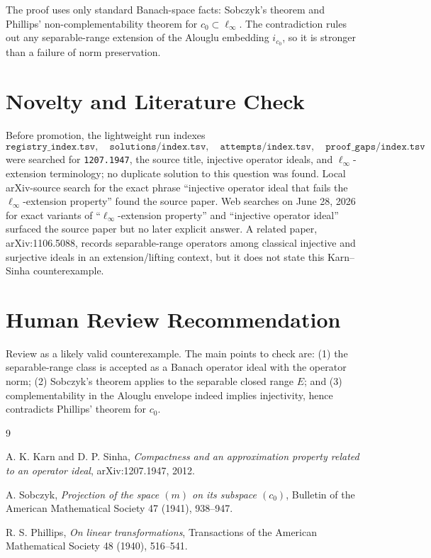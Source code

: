 \documentclass[11pt]{article}
\newcommand{\linf}{\ell_\infty}
\newcommand{\czero}{c_0}
\begin{document}
The proof uses only standard Banach-space facts: Sobczyk's theorem and Phillips' non-complementability theorem for $\czero\subset\linf$. The contradiction rules out any separable-range extension of the Alouglu embedding $i_{\czero}$, so it is stronger than a failure of norm preservation.

\section*{Novelty and Literature Check}

Before promotion, the lightweight run indexes
\[
\texttt{registry\_index.tsv},\quad \texttt{solutions/index.tsv},\quad
\texttt{attempts/index.tsv},\quad \texttt{proof\_gaps/index.tsv}
\]
were searched for \texttt{1207.1947}, the source title, injective operator ideals, and $\ell_\infty$-extension terminology; no duplicate solution to this question was found. Local arXiv-source search for the exact phrase ``injective operator ideal that fails the $\ell_\infty$-extension property'' found the source paper. Web searches on June 28, 2026 for exact variants of ``$\ell_\infty$-extension property'' and ``injective operator ideal'' surfaced the source paper but no later explicit answer. A related paper, arXiv:1106.5088, records separable-range operators among classical injective and surjective ideals in an extension/lifting context, but it does not state this Karn--Sinha counterexample.

\section*{Human Review Recommendation}

Review as a likely valid counterexample. The main points to check are: (1) the separable-range class is accepted as a Banach operator ideal with the operator norm; (2) Sobczyk's theorem applies to the separable closed range $E$; and (3) complementability in the Alouglu envelope indeed implies injectivity, hence contradicts Phillips' theorem for $\czero$.

\begin{thebibliography}{9}

A. K. Karn and D. P. Sinha,
\emph{Compactness and an approximation property related to an operator ideal},
arXiv:1207.1947, 2012.

A. Sobczyk,
\emph{Projection of the space $(m)$ on its subspace $(c_0)$},
Bulletin of the American Mathematical Society 47 (1941), 938--947.

R. S. Phillips,
\emph{On linear transformations},
Transactions of the American Mathematical Society 48 (1940), 516--541.

\end{thebibliography}
\end{document}
